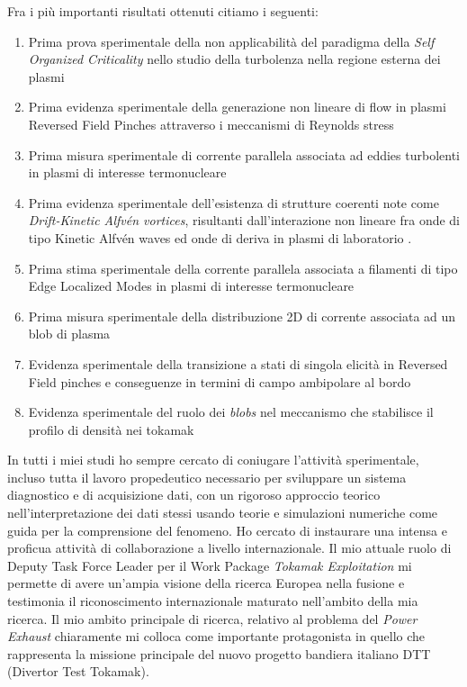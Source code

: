 Fra i pi{\`u} importanti risultati ottenuti citiamo i seguenti:
\begin{enumerate}[itemsep=0.05ex, label=\textbf{\roman*}]
\item Prima prova sperimentale della non applicabilit{\`a} del
  paradigma della \emph{Self
    Organized Criticality} nello studio della turbolenza nella regione
  esterna dei plasmi \parencite{Spada:2001p3574,Antoni:2001p3221}
\item Prima evidenza sperimentale della generazione non lineare di
  flow in plasmi Reversed Field Pinches attraverso i meccanismi di
  Reynolds stress \parencite{Vianello:2005p1976,Vianello:2005p2671}
\item Prima misura sperimentale di corrente parallela associata ad
  eddies turbolenti in plasmi di interesse termonucleare \parencite{Spolaore:2009p4115} 
\item Prima evidenza sperimentale dell'esistenza di strutture coerenti
  note come \emph{Drift-Kinetic Alfv\'en
    vortices}, risultanti dall'interazione non lineare fra onde di
  tipo 
  Kinetic Alfv\'en waves ed onde di deriva in plasmi di laboratorio
  \parencite{Vianello:2010p4670}.
\item Prima stima sperimentale della corrente parallela associata a
  filamenti di tipo Edge Localized Modes in plasmi di interesse termonucleare \parencite{PhysRevLett.106.125002}
\item Prima misura sperimentale della distribuzione 2D di corrente
  associata ad un blob di plasma \parencite{Furno:2011cs}
\item Evidenza sperimentale della transizione a stati di singola
  elicit{\`a} in Reversed Field pinches
  \parencite{Lorenzini:2009p4248} e conseguenze in termini di campo
  ambipolare al bordo \parencite{Spizzo:2014jn}
\item Evidenza sperimentale del ruolo dei \emph{blobs} nel meccanismo
  che stabilisce il profilo di densit{\`a} nei tokamak \parencite{Carralero:prl2015, Vianello:2017ku}
\end{enumerate}
In tutti i miei studi ho sempre cercato di coniugare l'attivit{\`a}
sperimentale, incluso tutta il lavoro propedeutico necessario per
sviluppare un sistema diagnostico e di acquisizione dati, con un
rigoroso approccio teorico nell'interpretazione dei dati stessi usando
teorie e simulazioni numeriche come guida per la comprensione del
fenomeno. Ho cercato di instaurare una intensa e proficua attivit{\`a}
di collaborazione a livello internazionale.
Il mio attuale ruolo di Deputy Task Force Leader per il Work Package
\emph{Tokamak Exploitation} mi permette di avere un'ampia visione
della ricerca Europea nella fusione e testimonia il riconoscimento
internazionale maturato nell'ambito della mia ricerca. Il mio ambito
principale di ricerca, relativo al problema del \emph{Power Exhaust}
chiaramente mi colloca come importante protagonista in quello che
rappresenta la missione principale del  nuovo
progetto bandiera italiano DTT (Divertor Test Tokamak).\\
